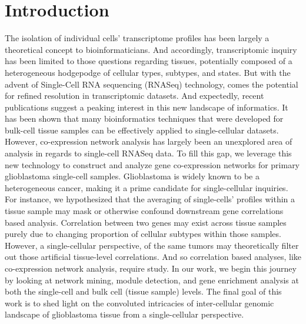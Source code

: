 \documentclass[10pt,letterpaper]{article}
\begin{document}
\section*{Introduction}
The isolation of individual cells’ transcriptome profiles has been largely a theoretical concept to bioinformaticians. And accordingly, transcriptomic inquiry has been limited to those questions regarding tissues, potentially composed of a heterogeneous hodgepodge of cellular types, subtypes, and states. But with the advent of Single-Cell RNA sequencing (RNASeq) technology, comes the potential for refined resolution in transcriptomic datasets. And expectedly, recent publications suggest a peaking interest in this new landscape of informatics. It has been shown that many bioinformatics techniques that were developed for bulk-cell tissue samples can be effectively applied to single-cellular datasets. %
However, co-expression network analysis has largely been an unexplored area of analysis in regards to single-cell RNASeq data. To fill this gap, we leverage this new technology to construct and analyze gene co-expression networks for primary glioblastoma single-cell samples. Glioblastoma is widely known to be a heterogeneous cancer, making it a prime candidate for single-cellular inquiries. For instance, we hypothesized that the averaging of single-cells’ profiles within a tissue sample may mask or otherwise confound downstream gene correlations based analysis. Correlation between two genes may exist across tissue samples purely due to changing proportion of cellular subtypes within those samples. However, a single-cellular perspective, of the same tumors may theoretically filter out those artificial tissue-level correlations. And so correlation based analyses, like co-expression network analysis, require study. In our work, we begin this journey by looking at network mining, module detection, and gene enrichment analysis at both the single-cell and bulk cell (tissue sample) levels. The final goal of this work is to shed light on the convoluted intricacies of inter-cellular genomic landscape of glioblastoma tissue from a single-cellular perspective.

\end{document}
